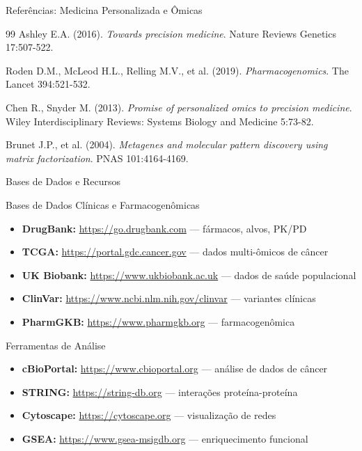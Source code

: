 \begin{frame}{Referências: Medicina Personalizada e Ômicas}
\begin{thebibliography}{99}
 Ashley E.A. (2016). \textit{Towards precision medicine}. Nature Reviews Genetics 17:507-522.

 Roden D.M., McLeod H.L., Relling M.V., et al. (2019). \textit{Pharmacogenomics}. The Lancet 394:521-532.

 Chen R., Snyder M. (2013). \textit{Promise of personalized omics to precision medicine}. Wiley Interdisciplinary Reviews: Systems Biology and Medicine 5:73-82.

 Brunet J.P., et al. (2004). \textit{Metagenes and molecular pattern discovery using matrix factorization}. PNAS 101:4164-4169.
\end{thebibliography}
\end{frame}

\begin{frame}{Bases de Dados e Recursos}
\begin{block}{Bases de Dados Clínicas e Farmacogenômicas}
\begin{itemize}
    \item \textbf{DrugBank:} \url{https://go.drugbank.com} --- fármacos, alvos, PK/PD
    \item \textbf{TCGA:} \url{https://portal.gdc.cancer.gov} --- dados multi-ômicos de câncer
    \item \textbf{UK Biobank:} \url{https://www.ukbiobank.ac.uk} --- dados de saúde populacional
    \item \textbf{ClinVar:} \url{https://www.ncbi.nlm.nih.gov/clinvar} --- variantes clínicas
    \item \textbf{PharmGKB:} \url{https://www.pharmgkb.org} --- farmacogenômica
\end{itemize}
\end{block}

\begin{block}{Ferramentas de Análise}
\begin{itemize}
    \item \textbf{cBioPortal:} \url{https://www.cbioportal.org} --- análise de dados de câncer
    \item \textbf{STRING:} \url{https://string-db.org} --- interações proteína-proteína
    \item \textbf{Cytoscape:} \url{https://cytoscape.org} --- visualização de redes
    \item \textbf{GSEA:} \url{https://www.gsea-msigdb.org} --- enriquecimento funcional
\end{itemize}
\end{block}
\end{frame}

